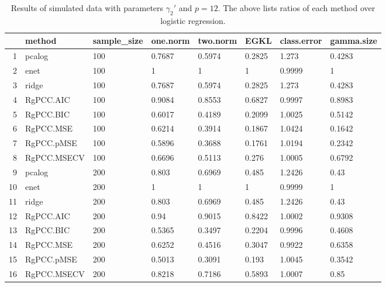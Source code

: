 \begin{table}[ht]
\centering
\begin{tabular}{rlllllll}
  \hline
 & method & sample\_size & one.norm & two.norm & EGKL & class.error & gamma.size \\ 
  \hline
1 & pcalog & 100 & 0.7687 & 0.5974 & 0.2825 & 1.273 & 0.4283 \\ 
  2 & enet & 100 & 1 & 1 & 1 & 0.9999 & 1 \\ 
  3 & ridge & 100 & 0.7687 & 0.5974 & 0.2825 & 1.273 & 0.4283 \\ 
  4 & RgPCC.AIC & 100 & 0.9084 & 0.8553 & 0.6827 & 0.9997 & 0.8983 \\ 
  5 & RgPCC.BIC & 100 & 0.6017 & 0.4189 & 0.2099 & 1.0025 & 0.5142 \\ 
  6 & RgPCC.MSE & 100 & 0.6214 & 0.3914 & 0.1867 & 1.0424 & 0.1642 \\ 
  7 & RgPCC.pMSE & 100 & 0.5896 & 0.3688 & 0.1761 & 1.0194 & 0.2342 \\ 
  8 & RgPCC.MSECV & 100 & 0.6696 & 0.5113 & 0.276 & 1.0005 & 0.6792 \\ 
  9 & pcalog & 200 & 0.803 & 0.6969 & 0.485 & 1.2426 & 0.43 \\ 
  10 & enet & 200 & 1 & 1 & 1 & 0.9999 & 1 \\ 
  11 & ridge & 200 & 0.803 & 0.6969 & 0.485 & 1.2426 & 0.43 \\ 
  12 & RgPCC.AIC & 200 & 0.94 & 0.9015 & 0.8422 & 1.0002 & 0.9308 \\ 
  13 & RgPCC.BIC & 200 & 0.5365 & 0.3497 & 0.2204 & 0.9996 & 0.4608 \\ 
  14 & RgPCC.MSE & 200 & 0.6252 & 0.4516 & 0.3047 & 0.9922 & 0.6358 \\ 
  15 & RgPCC.pMSE & 200 & 0.5013 & 0.3091 & 0.193 & 1.0045 & 0.3542 \\ 
  16 & RgPCC.MSECV & 200 & 0.8218 & 0.7186 & 0.5893 & 1.0007 & 0.85 \\ 
   \hline
\end{tabular}
\caption{Results of simulated data with parameters $\gamma_2'$ and $p =12$. The above lists ratios of each method over logistic regression.} 
\label{fig-2'-nonlead-12-metrics-pratio}
\end{table}
